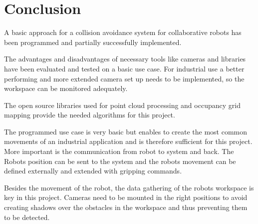 \chapter{Conclusion}
\label{chap:conclusion}

A basic approach for a collision avoidance system for collaborative robots has been programmed and partially successfully implemented. 

The advantages and disadvantages of necessary tools like cameras and libraries have been evaluated and tested on a basic use case. 
For industrial use a better performing and more extended camera set up needs to be implemented, so the workspace can be monitored adequately.

The open source libraries used for point cloud processing and occupancy grid mapping provide the needed algorithms for this project.

The programmed use case is very basic but enables to create the most common movements of an industrial application and is therefore sufficient for this project. More important is the communication from robot to system and back. The Robots position can be sent to the system and the robots movement can be defined externally and extended with gripping commands.

Besides the movement of the robot, the data gathering of the robots workspace is key in this project. Cameras need to be mounted in the right positions to avoid creating shadows over the obstacles in the workspace and thus preventing them to be detected.




